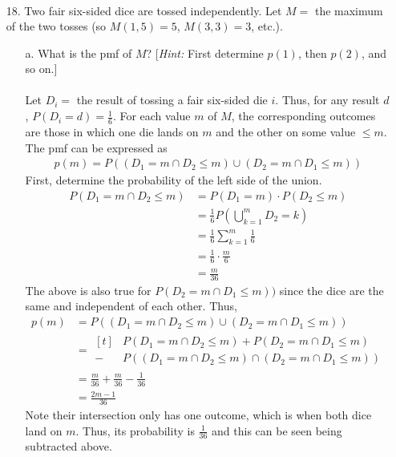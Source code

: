 \documentclass[letterpaper,12pt]{article}
\begin{document}
\begin{enumerate}
\begin{enumerate}
\begin{align*}
        \end{align*}
      \end{enumerate}
  \item[18.]
    Two fair six-sided dice are tossed independently. Let $M =$ the maximum of the two tosses (so $M(1,5) = 5$, $M(3,3) = 3$, etc.).
    \begin{enumerate}
      \item[a.]
        What is the pmf of $M$? [\textit{Hint:} First determine $p(1)$, then $p(2)$, and so on.]
        \\ \\
        Let $D_i =$ the result of tossing a fair six-sided die $i$. Thus, for any result $d$, $P(D_i = d) = \frac{1}{6}$. For each value $m$ of $M$, the corresponding outcomes are those in which one die lands on $m$ and the other on some value $\le m$. The pmf can be expressed as
        \begin{align*}
          p(m) = P((D_1 = m \cap D_2 \le m) \cup (D_2 = m \cap D_1 \le m))
        \end{align*}
        First, determine the probability of the left side of the union.
        \begin{align*}
          P(D_1 = m \cap D_2 \le m) &= P(D_1 = m) \cdot P(D_2 \le m) \\
          &= \frac{1}{6} P(\bigcup_{k=1}^m D_2 = k) \\
          &= \frac{1}{6} \sum_{k=1}^m \frac{1}{6} \\
          &= \frac{1}{6} \cdot \frac{m}{6} \\
          &= \frac{m}{36}
        \end{align*}
        The above is also true for $P(D_2 = m \cap D_1 \le m))$ since the dice are the same and independent of each other. Thus,
        \begin{align*}
          p(m) &= P((D_1 = m \cap D_2 \le m) \cup (D_2 = m \cap D_1 \le m)) \\
          &= \begin{aligned}[t]
            &P(D_1 = m \cap D_2 \le m) + P(D_2 = m \cap D_1 \le m) \\
            - &P((D_1 = m \cap D_2 \le m) \cap (D_2 = m \cap D_1 \le m))
          \end{aligned} \\
          &= \frac{m}{36} + \frac{m}{36} - \frac{1}{36} \\
          &= \frac{2m - 1}{36}
        \end{align*}
        Note their intersection only has one outcome, which is when both dice land on $m$. Thus, its probability is $\frac{1}{36}$ and this can be seen being subtracted above.

\end{enumerate}
\end{enumerate}
\end{document}
